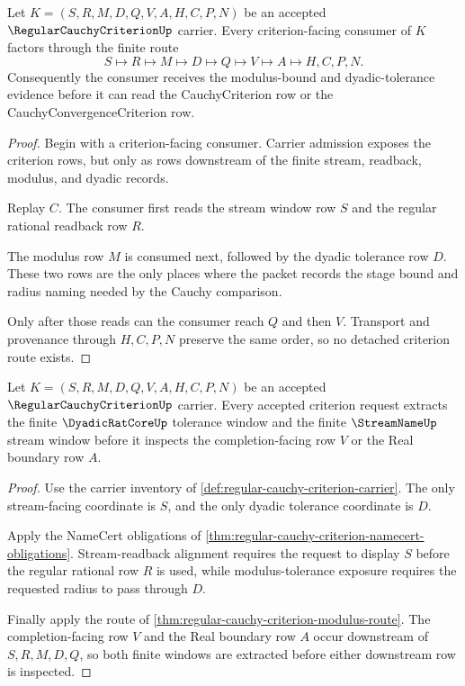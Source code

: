 \begin{theorem}
\label{thm:regular-cauchy-criterion-modulus-route}
Let $K=(S,R,M,D,Q,V,A,H,C,P,N)$ be an accepted $\RegularCauchyCriterionUp$ carrier. Every criterion-facing consumer of $K$ factors through the finite route
$$
S \longmapsto R \longmapsto M \longmapsto D \longmapsto Q \longmapsto V \longmapsto A \longmapsto H,C,P,N .
$$
Consequently the consumer receives the modulus-bound and dyadic-tolerance evidence before it can read the CauchyCriterion row or the CauchyConvergenceCriterion row.
\end{theorem}
\begin{proof}
Begin with a criterion-facing consumer. Carrier admission exposes the criterion rows, but only as rows downstream of the finite stream, readback, modulus, and dyadic records.

Replay $C$. The consumer first reads the stream window row $S$ and the regular rational readback row $R$.

The modulus row $M$ is consumed next, followed by the dyadic tolerance row $D$. These two rows are the only places where the packet records the stage bound and radius naming needed by the Cauchy comparison.

Only after those reads can the consumer reach $Q$ and then $V$. Transport and provenance through $H,C,P,N$ preserve the same order, so no detached criterion route exists.
\end{proof}

\begin{theorem}
\label{thm:regular-cauchy-criterion-window-extraction}
Let $K=(S,R,M,D,Q,V,A,H,C,P,N)$ be an accepted $\RegularCauchyCriterionUp$ carrier. Every accepted criterion request extracts the finite $\DyadicRatCoreUp$ tolerance window and the finite $\StreamNameUp$ stream window before it inspects the completion-facing row $V$ or the Real boundary row $A$.
\end{theorem}
\begin{proof}
Use the carrier inventory of \autoref{def:regular-cauchy-criterion-carrier}. The only stream-facing coordinate is $S$, and the only dyadic tolerance coordinate is $D$.

Apply the NameCert obligations of \autoref{thm:regular-cauchy-criterion-namecert-obligations}. Stream-readback alignment requires the request to display $S$ before the regular rational row $R$ is used, while modulus-tolerance exposure requires the requested radius to pass through $D$.

Finally apply the route of \autoref{thm:regular-cauchy-criterion-modulus-route}. The completion-facing row $V$ and the Real boundary row $A$ occur downstream of $S,R,M,D,Q$, so both finite windows are extracted before either downstream row is inspected.
\end{proof}

